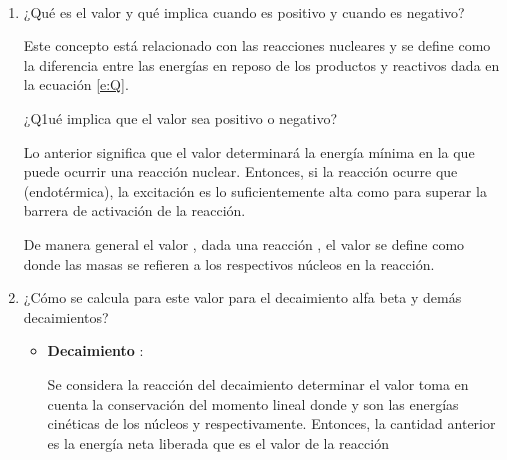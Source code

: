 \begin{center}
  \textbf{ \large {}}\\
\end{center}

\begin{enumerate}[1.]
\item  ¿Qué es el valor  y qué implica cuando es positivo y cuando es negativo?

Este concepto está relacionado con las reacciones nucleares y se define como la diferencia entre las energías en reposo de los productos y reactivos dada en la ecuación \ref{e:Q}.


¿Q1ué implica que el valor  sea positivo o negativo?

 
Lo anterior significa que el valor  determinará la energía mínima en la que puede ocurrir una reacción nuclear. Entonces, si la reacción ocurre que  (endotérmica), la excitación es lo suficientemente alta como para superar la barrera de activación de la reacción.

De manera general el valor , dada una reacción , el valor  se define como 
donde las masas  se refieren a los respectivos núcleos en la reacción.

\pagebreak

\item ¿Cómo se calcula para este valor para el decaimiento alfa beta y demás decaimientos?


\begin{itemize}
  \item \textbf{Decaimiento \ec{\alpha}}:
  
Se considera la reacción del decaimiento 
determinar el valor  toma en cuenta la conservación del momento lineal
donde  y  son las energías cinéticas de los núcleos  y \ec{\alpha} respectivamente. Entonces, la cantidad anterior es la energía neta liberada que es el valor  de la reacción


\end{itemize}
\end{enumerate}
